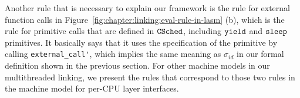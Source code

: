 Another rule that is necessary to explain our framework is the rule for external function calls in Figure~\ref{fig:chapter:linking:eval-rule-in-lasm} (b),
which is the rule for primitive calls that are defined in ${{\mathrm{\texttt{CSched}}}}$, including ${\mathrm{\texttt{yield}}}$ and ${\mathrm{\texttt{sleep}}}$ primitives.
It basically says that it uses 
the specification of the primitive by calling \lstinline$external_call'$,
which implies the same meaning as $\sigma_{id}$ in our formal definition shown in the previous section.
For other machine models in our multithreaded linking,
we present the rules that correspond to those two rules in the machine model for per-CPU  layer interfaces.


%
%
